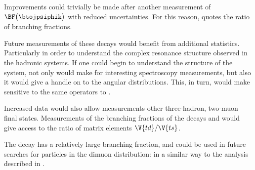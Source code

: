 Improvements could trivially be made after another measurement of
$\BF\big(\btojpsiphik\big)$ with reduced uncertainties.
For this reason,  quotes the ratio of branching fractions.

Future measurements of these decays would benefit from additional statistics.
Particularly in order to understand the complex resonance structure observed in the hadronic
systems.
If one could begin to understand the structure of the \kpipi system, not only would make for
interesting spectroscopy measurements, but also it would give a handle on to the \kpipi angular
distributions.
This, in turn, would make \btokpipimumu sensitive to the same operators to \btokstrmumu.


Increased data would also allow measurements other three-hadron, two-muon final states.
Measurements of the branching fractions of the decays \decay{\Bp}{\pip\pipi\mumu} and
\decay{\Bp}{\kk\pip\mumu} would give access to the ratio of \ckm matrix elements $\V{td}/\V{ts}$.

The decay \btokpipimumu has a relatively large branching fraction, and could be used in future
searches for \np particles in the dimuon distribution: in a similar way to the analysis described
in .





